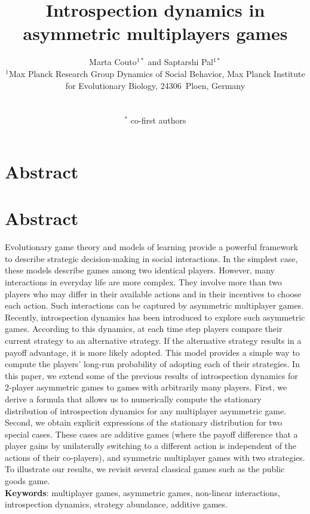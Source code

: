 \documentclass[11pt]{article}
\title{\sffamily \Large {\bfseries Introspection dynamics in asymmetric multiplayers games}}
\date{\empty}
\author{\parbox[c]{16cm}{\centering \onehalfspacing \fontsize{11}{12}\selectfont Marta Couto$^{1*}$ and Saptarshi Pal$^{1*}$\\[0.2cm]
$^1$Max Planck Research Group Dynamics of Social Behavior, Max Planck Institute for Evolutionary Biology, 24306~Ploen, Germany}\\ \\
$^*$ \fontsize{11}{12}\selectfont co-first authors}
\theoremstyle{plainCl1}
\theoremstyle{plainCl2}
\begin{document}
\maketitle
\onehalfspacing
\section*{Abstract}
\section*{Abstract}


Evolutionary game theory and models of learning provide a powerful framework to describe strategic decision-making in social interactions. 
In the simplest case, these models describe games among two identical players. 
However, many interactions in everyday life are more complex. 
They involve more than two players who may differ in their available actions and in their incentives to choose each action. 
Such interactions can be captured by asymmetric multiplayer games. 
Recently, introspection dynamics has been introduced to explore such asymmetric games. 
According to this dynamics, at each time step players compare their current strategy to an alternative strategy. 
If the alternative strategy results in a payoff advantage, it is more likely adopted. 
This model provides a simple way to compute the players’ long-run probability of adopting each of their strategies. 
In this paper, we extend some of the previous results of introspection dynamics for 2-player asymmetric games to games with arbitrarily many players. 
First, we derive a formula that allows us to numerically compute the stationary distribution of introspection dynamics for any multiplayer asymmetric game. 
Second, we obtain explicit expressions of the stationary distribution for two special cases. These cases are additive games (where the payoff difference that a player gains by unilaterally switching to a different action is independent of the actions of their co-players), and symmetric multiplayer games with two strategies. 
To illustrate our results, we revisit several classical games such as the public goods game.\\


\noindent \textbf{Keywords}: multiplayer games, asymmetric games, non-linear interactions, introspection dynamics, strategy abundance, additive games.
\end{document}

